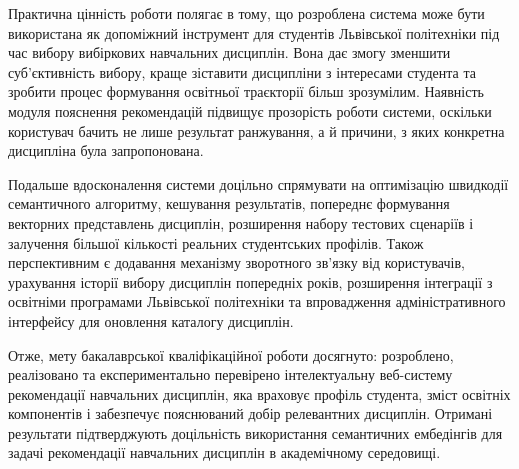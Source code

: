 \documentclass[
]{article}
\begin{document}
Практична цінність роботи полягає в тому, що розроблена система може
бути використана як допоміжний інструмент для студентів Львівської
політехніки під час вибору вибіркових навчальних дисциплін. Вона дає
змогу зменшити суб'єктивність вибору, краще зіставити дисципліни з
інтересами студента та зробити процес формування освітньої траєкторії
більш зрозумілим. Наявність модуля пояснення рекомендацій підвищує
прозорість роботи системи, оскільки користувач бачить не лише результат
ранжування, а й причини, з яких конкретна дисципліна була запропонована.

Подальше вдосконалення системи доцільно спрямувати на оптимізацію
швидкодії семантичного алгоритму, кешування результатів, попереднє
формування векторних представлень дисциплін, розширення набору тестових
сценаріїв і залучення більшої кількості реальних студентських профілів.
Також перспективним є додавання механізму зворотного зв'язку від
користувачів, урахування історії вибору дисциплін попередніх років,
розширення інтеграції з освітніми програмами Львівської політехніки та
впровадження адміністративного інтерфейсу для оновлення каталогу
дисциплін.

Отже, мету бакалаврської кваліфікаційної роботи досягнуто: розроблено,
реалізовано та експериментально перевірено інтелектуальну веб-систему
рекомендації навчальних дисциплін, яка враховує профіль студента, зміст
освітніх компонентів і забезпечує пояснюваний добір релевантних
дисциплін. Отримані результати підтверджують доцільність використання
семантичних ембедінгів для задачі рекомендації навчальних дисциплін в
академічному середовищі.
\end{document}
